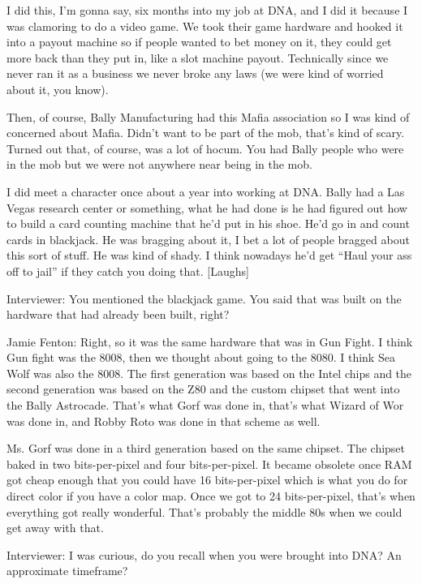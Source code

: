 I did this, I’m gonna say, six months into my job at DNA, and I did it because I was clamoring to do a video game. We took their game hardware and hooked it into a payout machine so if people wanted to bet money on it, they could get more back than they put in, like a slot machine payout. Technically since we never ran it as a business we never broke any laws (we were kind of worried about it, you know).

Then, of course, Bally Manufacturing had this Mafia association so I was kind of concerned about Mafia. Didn’t want to be part of the mob, that’s kind of scary. Turned out that, of course, was a lot of hocum. You had Bally people who were in the mob but we were not anywhere near being in the mob.

I did meet a character once about a year into working at DNA. Bally had a Las Vegas research center or something, what he had done is he had figured out how to build a card counting machine that he’d put in his shoe. He’d go in and count cards in blackjack. He was bragging about it, I bet a lot of people bragged about this sort of stuff. He was kind of shady. I think nowadays he’d get “Haul your ass off to jail” if they catch you doing that. [Laughs]

\textcolor{interviewer}{Interviewer:} You mentioned the blackjack game. You said that was built on the hardware that had already been built, right?

\textcolor{interviewee}{Jamie Fenton:} Right, so it was the same hardware that was in Gun Fight. I think Gun fight was the 8008, then we thought about going to the 8080. I think Sea Wolf was also the 8008. The first generation was based on the Intel chips and the second generation was based on the Z80 and the custom chipset that went into the Bally Astrocade. That’s what Gorf was done in, that’s what Wizard of Wor was done in, and Robby Roto was done in that scheme as well.

Ms. Gorf was done in a third generation based on the same chipset. The chipset baked in two bits-per-pixel and four bits-per-pixel. It became obsolete once RAM got cheap enough that you could have 16 bits-per-pixel which is what you do for direct color if you have a color map. Once we got to 24 bits-per-pixel, that’s when everything got really wonderful. That’s probably the middle 80s when we could get away with that.

\textcolor{interviewer}{Interviewer:} I was curious, do you recall when you were brought into DNA? An approximate timeframe?

